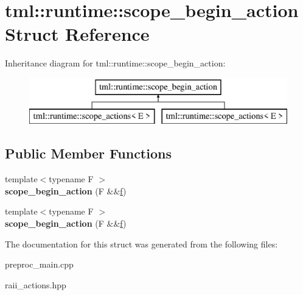 \hypertarget{structtml_1_1runtime_1_1scope__begin__action}{\section{tml\+:\+:runtime\+:\+:scope\+\_\+begin\+\_\+action Struct Reference}
\label{structtml_1_1runtime_1_1scope__begin__action}
}
Inheritance diagram for tml\+:\+:runtime\+:\+:scope\+\_\+begin\+\_\+action\+:\begin{figure}[H]
\begin{center}
\leavevmode
\includegraphics[height=2.000000cm]{structtml_1_1runtime_1_1scope__begin__action}
\end{center}
\end{figure}
\subsection*{Public Member Functions}
\begin{DoxyCompactItemize}
\item 
\hypertarget{structtml_1_1runtime_1_1scope__begin__action_a65836759e5f65262743edcd79300ac45}{{\footnotesize template$<$typename F $>$ }\\{\bfseries scope\+\_\+begin\+\_\+action} (F \&\&\hyperlink{structf}{f})}\label{structtml_1_1runtime_1_1scope__begin__action_a65836759e5f65262743edcd79300ac45}

\item 
\hypertarget{structtml_1_1runtime_1_1scope__begin__action_a65836759e5f65262743edcd79300ac45}{{\footnotesize template$<$typename F $>$ }\\{\bfseries scope\+\_\+begin\+\_\+action} (F \&\&\hyperlink{structf}{f})}\label{structtml_1_1runtime_1_1scope__begin__action_a65836759e5f65262743edcd79300ac45}

\end{DoxyCompactItemize}


The documentation for this struct was generated from the following files\+:\begin{DoxyCompactItemize}
\item 
preproc\+\_\+main.\+cpp\item 
raii\+\_\+actions.\+hpp\end{DoxyCompactItemize}
